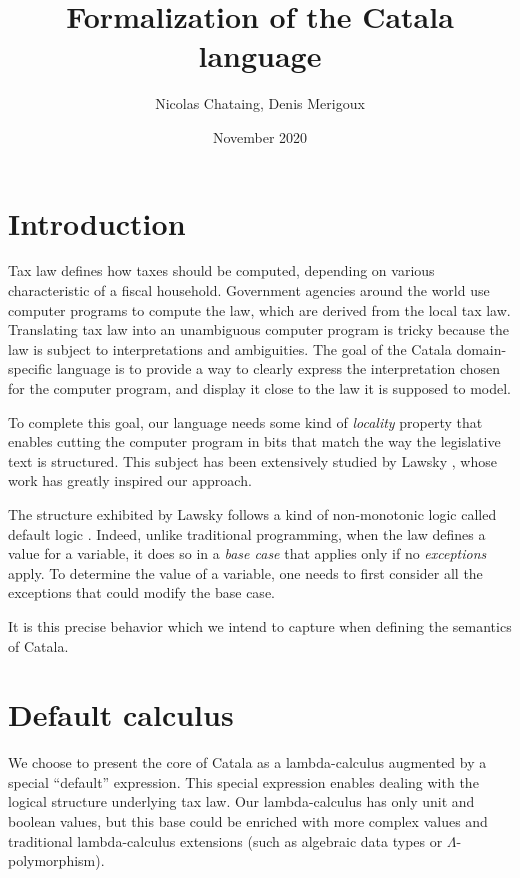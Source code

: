 \documentclass[11pt,a4paper]{article}
\title{Formalization of the Catala language}
\date{November 2020}
\author{Nicolas Chataing, Denis Merigoux}
\begin{document}
\maketitle

\tableofcontents

\section{Introduction}

Tax law defines how taxes should be computed, depending on various characteristic
of a fiscal household. Government agencies around the world use computer 
programs to compute the law, which are derived from the local tax law. Translating 
tax law into an unambiguous computer program is tricky because the law is subject to 
interpretations and ambiguities. The goal of the Catala domain-specific language 
is to provide a way to clearly express the interpretation chosen for the 
computer program, and display it close to the law it is supposed to model.

To complete this goal, our language needs some kind of \emph{locality} property
that enables cutting the computer program in bits that match the way the 
legislative text is structured. This subject has been extensively studied by
Lawsky \cite{lawsky2017, lawsky2018, lawsky2020form}, whose work has greatly 
inspired our approach.

The structure exhibited by Lawsky follows a kind of non-monotonic logic called 
default logic \cite{Reiter1987}. Indeed, unlike traditional programming, when the law defines 
a value for a variable, it does so in a \emph{base case} that applies only if 
no \emph{exceptions} apply. To determine the value of a variable, one needs to 
first consider all the exceptions that could modify the base case. 

It is this precise behavior which we intend to capture when defining the semantics 
of Catala.

\section{Default calculus}

We choose to present the core of Catala as a lambda-calculus augmented by a special 
\enquote{default} expression. This special expression enables dealing with 
the logical structure underlying tax law. Our lambda-calculus has only unit and 
boolean values, but this base could be enriched with more complex values and traditional 
lambda-calculus extensions (such as algebraic data types or $\Lambda$-polymorphism).
\end{document}
